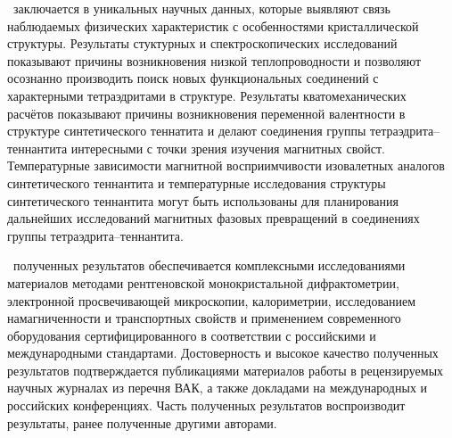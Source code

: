 \influence\ заключается в уникальных научных данных, которые выявляют связь наблюдаемых физических характеристик с особенностями кристаллической структуры. 
Результаты стуктурных и спектроскопических исследований показывают причины возникновения низкой теплопроводности и позволяют осознанно производить поиск новых функциональных соединений с характерными тетраэдритами в структуре. Результаты кватомеханических расчётов показывают причины возникновения переменной валентности в структуре синтетического теннатита и делают соединения группы тетраэдрита--теннантита интересными с точки зрения изучения магнитных свойст.
Температурные зависимости магнитной восприимчивости изовалетных аналогов синтетического теннантита и температурные исследования структуры синтетического теннантита могут быть использованы для планирования дальнейших исследований магнитных фазовых превращений в соединениях группы тетраэдрита--теннантита.

\reliability\ полученных результатов обеспечивается комплексными
исследованиями материалов  методами рентгеновской монокристальной дифрактометрии, электронной просвечивающей микроскопии, калориметрии, исследованием намагниченности и транспортных свойств и применением современного оборудования
сертифицированного в соответствии с российскими и международными стандартами.
Достоверность и высокое качество полученных результатов
подтверждается публикациями материалов работы в рецензируемых научных журналах из перечня ВАК, а также докладами на международных и российских
конференциях.
Часть полученных результатов воспроизводит результаты, ранее полученные другими авторами.


